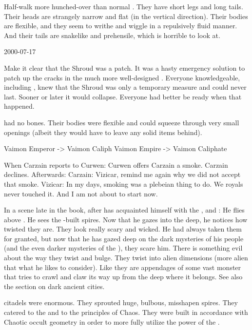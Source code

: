 Half-\nagae walk more hunched-over than normal \scathae.
They have short legs and long tails. 
Their heads are strangely narrow and flat (in the vertical direction). 
Their bodies are flexible, and they seem to writhe and wiggle in a repulsively fluid manner.
And their tails are snakelike and prehensile, which is horrible to look at.



2000-07-17 

Make it clear that the Shroud was a patch. 
It was a hasty emergency solution to patch up the cracks in the much more well-designed \CrystalSphere. 
Everyone knowledgeable, including \Ishnaruchaefir, knew that the Shroud was only a temporary measure and could never last. 
Sooner or later it would collapse.
Everyone had better be ready when that happened. 


\Banes had no bones.
Their bodies were flexible and could squeeze through very small openings (albeit they would have to leave any solid items behind). 


Vaimon Emperor -> Vaimon Caliph
Vaimon Empire  -> Vaimon Caliphate


When Carzain reports to Curwen:
  Curwen offers Carzain a smoke.
  Carzain declines.
Afterwards:
  Carzain: Vizicar, remind me again why we did not accept that smoke. 
  Vizicar: In my days, smoking was a plebeian thing to do. We royals never touched it. And I am not about to start now. 


In a scene late in the book, after \Teshrial has acquainted himself with the \noggyaleth, \neoresphain and \WanderersInDarknessEmph:
  He flies above \Nyx.
  He sees the \bane-built spires. 
  Now that he gazes into the deep, he notices how twisted they are.
  They look really scary and wicked.
  He had always taken them for granted, but now that he has gazed deep on the dark mysteries of his people (and the even darker mysteries of the \banes), they scare him.
  There is something evil about the way they twist and bulge.
  They twist into alien dimensions (more alien that what he likes to consider). 
  Like they are appendages of some vast monster that tries to crawl and claw its way up from the deep where it belongs. 
  See also the section on dark ancient cities. 


\Draconian citadels were enormous. 
They sprouted huge, bulbous, misshapen spires.
They catered to the \xss and to the principles of Chaos. 
They were built in accordance with Chaotic occult geometry in order to more fully utilize the power of the \xss. 


